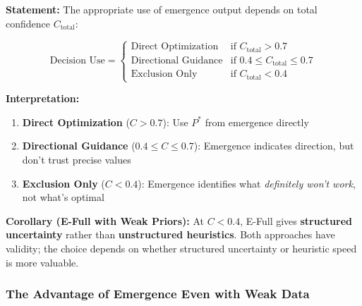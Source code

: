 \begin{tcolorbox}[colback=blue!5!white, colframe=blue!75!black,
    title=\textbf{Theorem HHH-T8: Confidence-Weighted Decision Rule}]

\textbf{Statement:} The appropriate use of emergence output depends on total confidence $C_{\text{total}}$:

\begin{equation}
\boxed{
\text{Decision Use} = \begin{cases}
\text{Direct Optimization} & \text{if } C_{\text{total}} > 0.7 \\
\text{Directional Guidance} & \text{if } 0.4 \leq C_{\text{total}} \leq 0.7 \\
\text{Exclusion Only} & \text{if } C_{\text{total}} < 0.4
\end{cases}
}
\label{eq:hhh-decision-rule}
\end{equation}

\textbf{Interpretation:}
\begin{enumerate}[nosep]
    \item \textbf{Direct Optimization} ($C > 0.7$): Use $P^*$ from emergence directly
    \item \textbf{Directional Guidance} ($0.4 \leq C \leq 0.7$): Emergence indicates direction, but don't trust precise values
    \item \textbf{Exclusion Only} ($C < 0.4$): Emergence identifies what \textit{definitely won't work}, not what's optimal
\end{enumerate}

\textbf{Corollary (E-Full with Weak Priors):} At $C < 0.4$, E-Full gives \textbf{structured uncertainty} rather than \textbf{unstructured heuristics}. Both approaches have validity; the choice depends on whether structured uncertainty or heuristic speed is more valuable.
\end{tcolorbox}

\subsubsection{The Advantage of Emergence Even with Weak Data}

